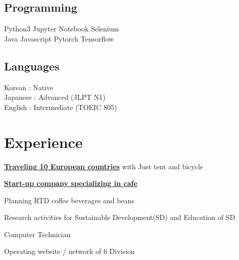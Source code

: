 \documentclass[]{deedy-resume-openfont}
\begin{document}
\begin{minipage}[t]{0.44\textwidth}
\subsection{Programming}
Python3 \textbullet{} Jupyter Notebook \textbullet{} Selenium \textbullet{} \\Java \textbullet{} Javascript \textbullet{} Pytorch  \textbullet{} Tensorflow \\
\sectionsep

\subsection{Languages}
Korean : Native \\
Japanese : Advanced (JLPT N1)\\
English : Intermediate (TOEIC 805)\\
\sectionsep

\section{Experience}

\vspace{\topsep}
\begin{tightemize}
\item \textbf{\href{https://nhandsome.github.io/daily/2020/09/17/daily-bicycle-INTRO/}{Traveling 10 European countries}} with Just tent and bicycle
\end{tightemize}
\sectionsep

\begin{tightemize}
\item \textbf{\href{https://handium.co.kr/}{Start-up company specializing in cafe}}
\item Planning RTD coffee beverages and beans
\end{tightemize}
\sectionsep

\begin{tightemize}
\item Research activities for Sustainable Development(SD) and Education of SD
\end{tightemize}
\sectionsep

\begin{tightemize}
\item Computer Technician
\item Operating website / network of 6 Division
\end{tightemize}
\sectionsep


%
%

\end{minipage} 
\end{document}
